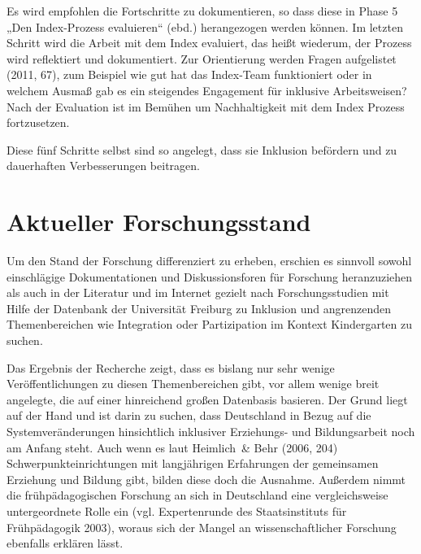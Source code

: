 Es wird empfohlen die Fortschritte zu dokumentieren, so dass diese in Phase 5 „Den Index-Prozess evaluieren“ (ebd.) herangezogen werden können. Im letzten Schritt wird die Arbeit mit dem Index evaluiert, das heißt wiederum, der Prozess wird reflektiert und dokumentiert. Zur Orientierung werden Fragen aufgelistet (2011, 67), zum Beispiel wie gut hat das Index-Team funktioniert oder in welchem Ausmaß gab es ein steigendes Engagement für inklusive Arbeitsweisen? Nach der Evaluation ist im Bemühen um Nachhaltigkeit mit dem Index Prozess fortzusetzen. 
  
Diese fünf Schritte selbst sind so angelegt, dass sie Inklusion befördern und zu dauerhaften Verbesserungen beitragen.

\chapter{Aktueller Forschungsstand}\label{Forschung}

Um den Stand der Forschung differenziert zu erheben, erschien es sinnvoll sowohl einschlägige Dokumentationen und Diskussionsforen für Forschung heranzuziehen als auch in der Literatur und im Internet gezielt nach Forschungsstudien mit Hilfe der Datenbank der Universität Freiburg zu Inklusion und angrenzenden Themenbereichen wie Integration oder Partizipation im Kontext Kindergarten zu suchen.

Das Ergebnis der Recherche zeigt, dass es bislang nur sehr wenige Veröffentlichungen zu diesen Themenbereichen gibt, vor allem wenige breit angelegte, die auf einer hinreichend großen Datenbasis basieren. Der Grund liegt auf der Hand und ist darin zu suchen, dass Deutschland in Bezug auf die Systemveränderungen hinsichtlich inklusiver Erziehungs- und Bildungsarbeit noch am Anfang steht. Auch wenn es laut Heimlich~\& Behr (2006, 204) Schwerpunkteinrichtungen mit langjährigen Erfahrungen der gemeinsamen Erziehung und Bildung gibt, bilden diese doch die Ausnahme.  
Außerdem nimmt die frühpädagogischen Forschung an sich in Deutschland eine vergleichsweise untergeordnete Rolle ein (vgl. Expertenrunde des Staatsinstituts für Frühpädagogik 2003), woraus sich der Mangel an wissenschaftlicher Forschung ebenfalls erklären lässt. 

